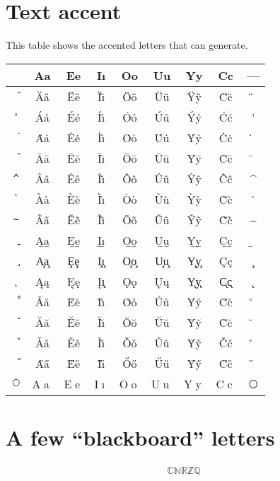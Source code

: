 \documentclass{article}
\newcommand{\zyva}[1]
{\texttt{\string#1} & #1{A}#1{a} & #1{E}#1{e} & #1{I}#1{\i} & #1{O}#1{o} &
#1{U}#1{u} & #1{Y}#1{y} & #1{C}#1{c} & #1{}}
\begin{document}
\section*{Text accent}
This table shows the accented letters that \hevea{} can generate.
\begin{tabular}{c@{\quad}*{8}{c}}
 & \textbf{Aa} &  \textbf{Ee} & \textbf{I\i} & \textbf{Oo} & \textbf{Uu}
 & \textbf{Yy} & \textbf{Cc} & --- \\
\hline
\zyva{\"}\\
\zyva{\'}\\
\zyva{\.}\\
\zyva{\=}\\
\zyva{\^}\\
\zyva{\`}\\
\zyva{\~}\\
\zyva{\b}\\
\zyva{\c}\\
\zyva{\k}\\
\zyva{\r}\\
\zyva{\u}\\
\zyva{\v}\\
\zyva{\H}\\
\zyva{\textcircled}
\hline
\end{tabular}

\section*{A few ``blackboard'' letters}
$$
\begin{array}{c}
\mathbb{CNRZQ}
\end{array}
$$
\end{document}
